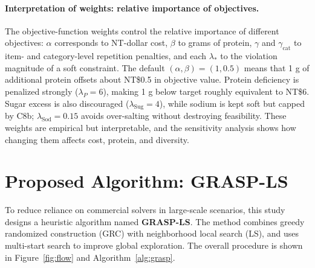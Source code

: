 \documentclass[a4paper]{article}
\begin{document}
\paragraph{Interpretation of weights: relative importance of objectives.}The objective-function weights control the relative importance of different objectives: $\alpha$ corresponds to NT-dollar cost, $\beta$ to grams of protein, $\gamma$ and $\gamma_{\text{cat}}$ to item- and category-level repetition penalties, and each $\lambda_*$ to the violation magnitude of a soft constraint. The default $(\alpha,\beta)=(1,0.5)$ means that 1 g of additional protein offsets about NT\$0.5 in objective value. Protein deficiency is penalized strongly ($\lambda_P=6$), making 1 g below target roughly equivalent to NT\$6. Sugar excess is also discouraged ($\lambda_{\text{Sug}}=4$), while sodium is kept soft but capped by C8b; $\lambda_{\text{Sod}}=0.15$ avoids over-salting without destroying feasibility. These weights are empirical but interpretable, and the sensitivity analysis shows how changing them affects cost, protein, and diversity.

\section{Proposed Algorithm: GRASP-LS}\label{sec:alg}
To reduce reliance on commercial solvers in large-scale scenarios, this study designs a heuristic algorithm named \textbf{GRASP-LS}. The method combines greedy randomized construction (GRC) with neighborhood local search (LS), and uses multi-start search to improve global exploration. The overall procedure is shown in Figure~\ref{fig:flow} and \mbox{Algorithm~\ref{alg:grasp}}.
\end{document}
